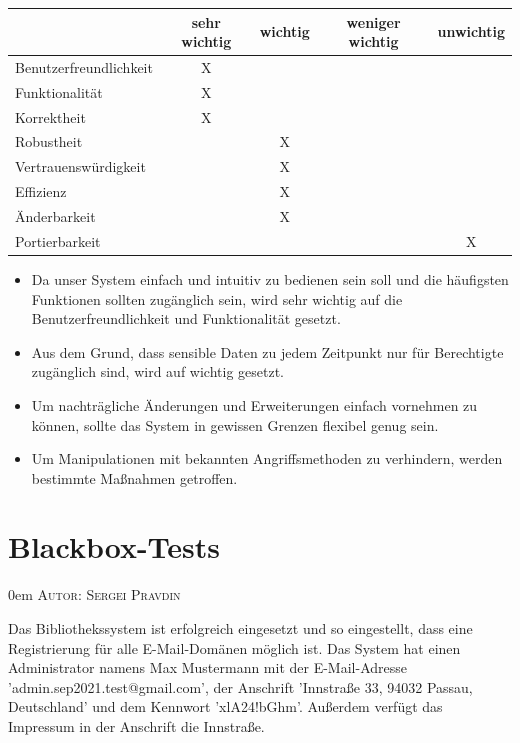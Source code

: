 \documentclass{article}
\makeatletter
\newcommand{\sectionauthor}[1]{
	{\parindent 0em \large \scshape Autor: #1 \par \nobreak \vspace*{2em}}
	\@afterheading
}
\makeatother
\begin{document}
\begin{center}
\begin{tabular}{ |l||c|c|c|c| } 
 \hline
  & sehr wichtig & wichtig & weniger wichtig & unwichtig \\
 \hline\hline
 Benutzerfreundlichkeit & X & & & \\
 \hline
 Funktionalität & X & & & \\ 
 \hline
 Korrektheit & X & & & \\
 \hline
 Robustheit & & X & & \\
 \hline
 Vertrauenswürdigkeit & & X & & \\
 \hline
 Effizienz & & X & & \\
 \hline
 Änderbarkeit & & X & & \\
 \hline
 Portierbarkeit & & &  & X \\

 \hline
\end{tabular}
\end{center}
\begin{itemize}
\item Da  unser System einfach und intuitiv zu bedienen sein soll und die häufigsten Funktionen sollten
 zugänglich sein, wird sehr wichtig  auf die Benutzerfreundlichkeit und Funktionalität gesetzt.
\item Aus dem Grund, dass sensible Daten zu jedem Zeitpunkt nur für Berechtigte zugänglich sind, wird auf  wichtig gesetzt.
\item Um nachträgliche Änderungen und Erweiterungen einfach vornehmen zu können, 
sollte das System in gewissen Grenzen flexibel genug sein.
\item Um Manipulationen mit bekannten Angriffsmethoden zu verhindern, werden bestimmte Maßnahmen getroffen.
\end{itemize}

\section{Blackbox-Tests} %
\sectionauthor{Sergei Pravdin}
Das Bibliothekssystem ist erfolgreich eingesetzt und so eingestellt, dass eine Registrierung für alle E-Mail-Domänen möglich ist. Das System hat einen Administrator namens Max Mustermann mit der E-Mail-Adresse 'admin.sep2021.test@gmail.com', der Anschrift 'Innstraße 33, 94032 Passau, Deutschland' und dem Kennwort 'xlA24!bGhm'. Außerdem verfügt das Impressum in der Anschrift die Innstraße. \vspace{0.5em}
\end{document}

